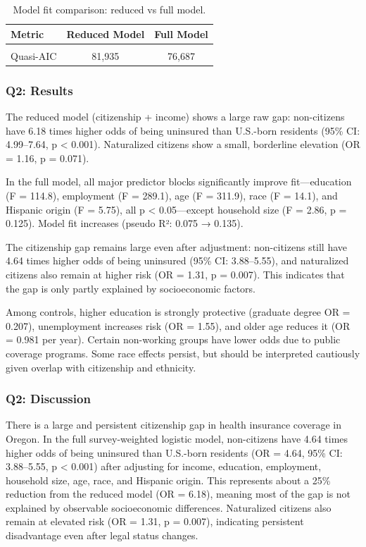 \documentclass[
  letterpaper,
  DIV=11,
  numbers=noendperiod]{scrartcl}
\begin{document}
\begingroup\fontsize{10}{12}\selectfont

\begin{longtable}[t]{lcc}
\caption{\label{tab:q2-results-table}Model fit comparison: reduced vs full model.}\\
\toprule
Metric & Reduced Model & Full Model\\
\midrule
\cellcolor{gray!10}{McFadden R²} & \cellcolor{gray!10}{0.075} & \cellcolor{gray!10}{0.135}\\
Quasi-AIC & 81,935 & 76,687\\
\bottomrule
\end{longtable}
\endgroup{}

\subsubsection{Q2: Results}\label{q2-results}

The reduced model (citizenship + income) shows a large raw gap:
non-citizens have 6.18 times higher odds of being uninsured than
U.S.-born residents (95\% CI: 4.99--7.64, p \textless{} 0.001).
Naturalized citizens show a small, borderline elevation (OR = 1.16, p =
0.071).

In the full model, all major predictor blocks significantly improve
fit---education (F = 114.8), employment (F = 289.1), age (F = 311.9),
race (F = 14.1), and Hispanic origin (F = 5.75), all p \textless{}
0.05---except household size (F = 2.86, p = 0.125). Model fit increases
(pseudo R²: 0.075 → 0.135).

The citizenship gap remains large even after adjustment: non-citizens
still have 4.64 times higher odds of being uninsured (95\% CI:
3.88--5.55), and naturalized citizens also remain at higher risk (OR =
1.31, p = 0.007). This indicates that the gap is only partly explained
by socioeconomic factors.

Among controls, higher education is strongly protective (graduate degree
OR = 0.207), unemployment increases risk (OR = 1.55), and older age
reduces it (OR = 0.981 per year). Certain non-working groups have lower
odds due to public coverage programs. Some race effects persist, but
should be interpreted cautiously given overlap with citizenship and
ethnicity.

\subsubsection{Q2: Discussion}\label{q2-discussion}

There is a large and persistent citizenship gap in health insurance
coverage in Oregon. In the full survey-weighted logistic model,
non-citizens have 4.64 times higher odds of being uninsured than
U.S.-born residents (OR = 4.64, 95\% CI: 3.88--5.55, p \textless{}
0.001) after adjusting for income, education, employment, household
size, age, race, and Hispanic origin. This represents about a 25\%
reduction from the reduced model (OR = 6.18), meaning most of the gap is
not explained by observable socioeconomic differences. Naturalized
citizens also remain at elevated risk (OR = 1.31, p = 0.007), indicating
persistent disadvantage even after legal status changes.
\end{document}
